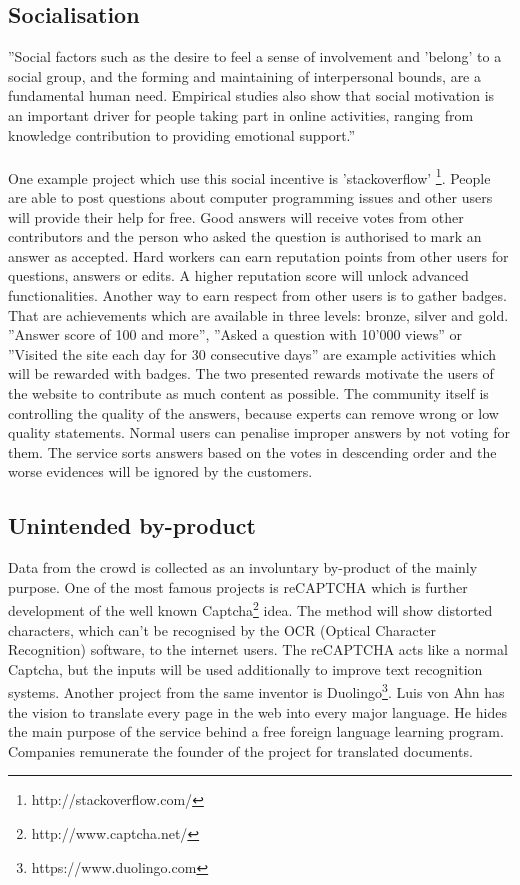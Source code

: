 \subsection{Socialisation}
''Social factors such as the desire to feel a sense of involvement and 'belong' to a social group, and the forming and maintaining of interpersonal bounds, are a fundamental human need. Empirical studies also show that social motivation is an important driver for people taking part in online activities, ranging from knowledge contribution to providing emotional support.'' \cite{yu} \\
\\
One example project which use this social incentive is 'stackoverflow' \footnote{http://stackoverflow.com/}. People are able to post questions about computer programming issues and other users will provide their help for free. Good answers will receive votes from other contributors and the person who asked the question is authorised to mark an answer as accepted. Hard workers can earn reputation points from other users for questions, answers or edits. A higher reputation score will unlock advanced functionalities. Another way to earn respect from other users is to gather badges. That are achievements which are available in three levels: bronze, silver and gold. ''Answer score of 100 and more'', ''Asked a question with 10'000 views'' or ''Visited the site each day for 30 consecutive days'' are example activities which will be rewarded with badges. The two presented rewards motivate the users of the website to contribute as much content as possible. The community itself is controlling the quality of the answers, because experts can remove wrong or low quality statements. Normal users can penalise improper answers by not voting for them. The service sorts answers based on the votes in descending order and the worse evidences will be ignored by the customers.

\subsection{Unintended by-product}
Data from the crowd is collected as an involuntary by-product of the mainly purpose. One of the most famous projects is reCAPTCHA\cite{recaptcha} which is further development of the well known Captcha\footnote{http://www.captcha.net/} idea. The method will show distorted characters,  which can't be recognised by the OCR (Optical Character Recognition) software, to the internet users. The reCAPTCHA acts like a normal Captcha, but the inputs will be used additionally to improve text recognition systems. 
Another project from the same inventor is Duolingo\footnote{https://www.duolingo.com}. Luis von Ahn has the vision to translate every page in the web into every major language. He hides the main purpose of the service behind a free foreign language learning program. Companies remunerate the founder of the project for translated documents.

